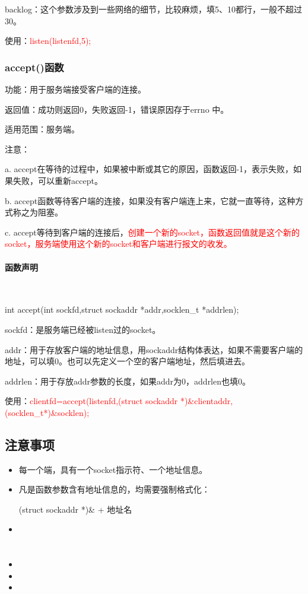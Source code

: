 \documentclass[UTF8]{article}%
\begin{document}
backlog：这个参数涉及到一些网络的细节，比较麻烦，填5、10都行，一般不超过30。

使用：\textcolor{red}{listen(listenfd,5);}

\subsubsection{accept()函数}

功能：用于服务端接受客户端的连接。

返回值：成功则返回0，失败返回-1，错误原因存于errno 中。

适用范围：服务端。

注意：

a. accept在等待的过程中，如果被中断或其它的原因，函数返回-1，表示失败，如果失败，可以重新accept。

b. accept函数等待客户端的连接，如果没有客户端连上来，它就一直等待，这种方式称之为阻塞。

c. accept等待到客户端的连接后，\textcolor{red}{创建一个新的socket，函数返回值就是这个新的socket，服务端使用这个新的socket和客户端进行报文的收发。}

\paragraph{函数声明}~{}

int accept(int sockfd,struct sockaddr *addr,socklen\_t *addrlen);

sockfd：是服务端已经被listen过的socket。

addr：用于存放客户端的地址信息，用sockaddr结构体表达，如果不需要客户端的地址，可以填0。也可以先定义一个空的客户端地址，然后填进去。

addrlen：用于存放addr参数的长度，如果addr为0，addrlen也填0。

使用：\textcolor{red}{clientfd=accept(listenfd,(struct sockaddr *)\&clientaddr,(socklen\_t*)\&socklen);}

\subsection{注意事项}

\begin{itemize}
    \item 每一个端，具有一个socket指示符、一个地址信息。
    \item 凡是函数参数含有地址信息的，均需要强制格式化：
    
    (struct sockaddr *)\& + 地址名

    \item 
\end{itemize}

\section{}




\begin{itemize}
    \item 
    \item 
    \item 
\end{itemize}
\end{document}

